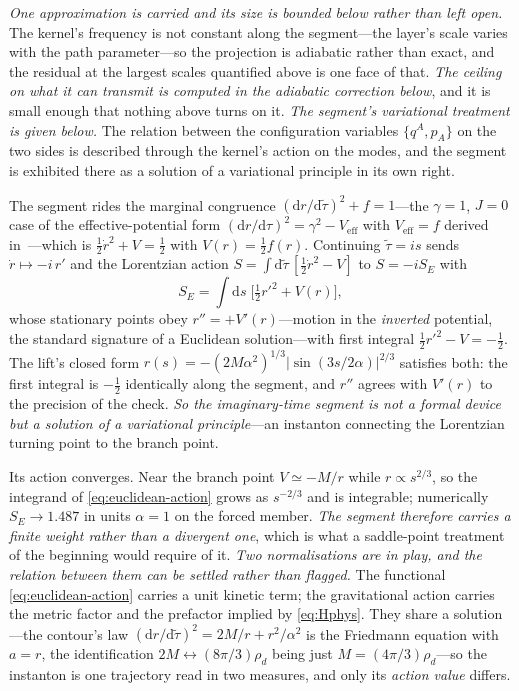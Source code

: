 \documentclass[11pt,a4paper]{article}
\theoremstyle{plain}
\theoremstyle{definition}
\theoremstyle{remark}
\newcommand{\dd}{\mathrm{d}}   %
\begin{document}
\emph{One approximation is carried and its size is bounded below rather than left open.} The kernel's
frequency is not constant along the segment---the layer's scale varies with the path parameter---so the
projection is adiabatic rather than exact, and the residual at the largest scales quantified above is one
face of that. \emph{The ceiling on what it can transmit is computed in the adiabatic correction below}, and it is
small enough that nothing above turns on it.
\emph{The segment's variational treatment is given below.} The relation
between the configuration variables $\{q^A,p_A\}$ on the two sides is described through the kernel's
action on the modes, and the segment is exhibited there as a solution of a variational principle in its
own right.

The segment rides the marginal congruence $(\dd r/\dd\tilde\tau)^{2}+f=1$---the $\gamma=1$, $J=0$ case of the effective-potential form $(\dd r/\dd\tau)^{2}=\gamma^{2}-V_{\mathrm{eff}}$ with $V_{\mathrm{eff}}=f$ derived in~\cite[Eq.~(4.24)]{JanzenThesis}---which is $\tfrac12\dot r^{2}+V=\tfrac12$ with
$V(r)=\tfrac12 f(r)$. Continuing $\tilde\tau=is$ sends $\dot r\mapsto-i\,r'$ and the Lorentzian action
$S=\int\dd\tilde\tau\,[\tfrac12\dot r^{2}-V]$ to $S=-iS_{E}$ with
\begin{equation}
S_{E}=\int\dd s\;\Big[\tfrac12 r'^{2}+V(r)\Big],
\label{eq:euclidean-action}
\end{equation}
whose stationary points obey $r''=+V'(r)$---motion in the \emph{inverted} potential, the standard signature of
a Euclidean solution---with first integral $\tfrac12 r'^{2}-V=-\tfrac12$. The lift's closed form
$r(s)=-(2M\alpha^{2})^{1/3}\lvert\sin(3s/2\alpha)\rvert^{2/3}$ satisfies both: the first integral is
$-\tfrac12$ identically along the segment, and $r''$ agrees with $V'(r)$ to the precision of the
check. \emph{So the imaginary-time segment is not a formal device but a solution of
a variational principle}---an instanton connecting the Lorentzian turning point to the branch point.

Its action converges. Near the branch point $V\simeq-M/r$ while $r\propto s^{2/3}$, so the integrand of
\eqref{eq:euclidean-action} grows as $s^{-2/3}$ and is integrable; numerically
$S_{E}\to1.487$ in units $\alpha=1$ on the forced member. \emph{The segment therefore carries a finite weight
rather than a divergent one}, which is what a saddle-point treatment of the beginning would require of it.
\emph{Two normalisations are in play, and the relation between them can be settled rather than flagged.} The
functional \eqref{eq:euclidean-action} carries a unit kinetic term; the gravitational action carries the metric
factor and the prefactor implied by \eqref{eq:Hphys}. They share a solution---the contour's law
$(\dd r/\dd\tilde\tau)^{2}=2M/r+r^{2}/\alpha^{2}$ is the Friedmann equation with $a=r$, the identification
$2M\leftrightarrow(8\pi/3)\rho_{d}$ being just $M=(4\pi/3)\rho_{d}$---so the instanton is one trajectory read in
two measures, and only its \emph{action value} differs.
\end{document}

